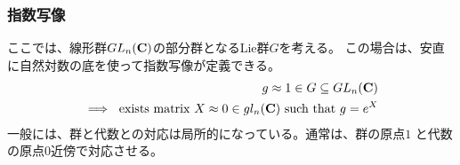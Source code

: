 {\subsubsection{指数写像}\label{s3:指数写像} %
	ここでは、線形群$GL_n(\mathbf{C})$の部分群となるLie群$G$を考える。
	この場合は、安直に自然対数の底を使って指数写像が定義できる。
	\begin{equation*}\begin{split}
		g\approx1\in G\subseteq GL_n(\mathbf{C}) \\
		\implies \text{ exists matrix } 
		X\approx0\in gl_n(\mathbf{C}) \text{ such that } g = e^X
	\end{split}\end{equation*}
	一般には、群と代数との対応は局所的になっている。通常は、群の原点$1$
	と代数の原点$0$近傍で対応させる。

}
